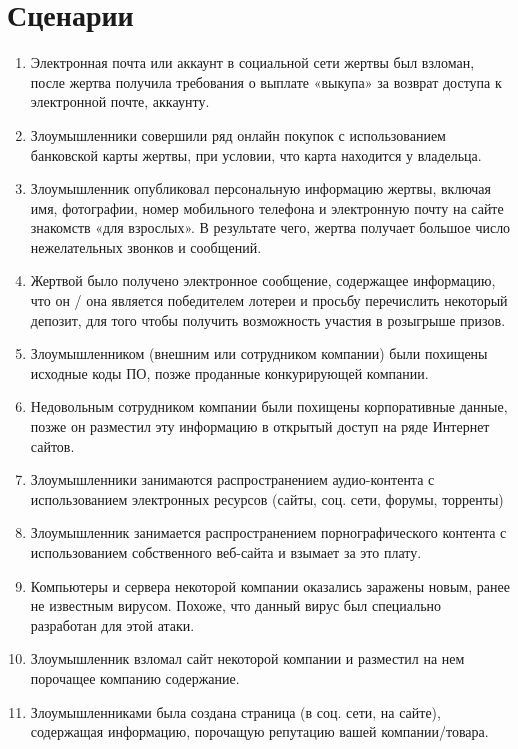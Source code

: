 \section*{Сценарии}

\begin{enumerate}
  \item Электронная почта или аккаунт в социальной сети жертвы был взломан,
    после жертва получила требования о выплате «выкупа» за возврат доступа к
    электронной почте, аккаунту.
  \item Злоумышленники совершили ряд онлайн покупок с использованием банковской
    карты жертвы, при условии, что карта находится у владельца.
  \item Злоумышленник опубликовал персональную информацию жертвы, включая имя,
    фотографии, номер мобильного телефона и электронную почту на сайте
    знакомств «для взрослых». В результате чего, жертва получает большое число
    нежелательных звонков и сообщений.
  \item Жертвой было получено электронное сообщение, содержащее информацию, что
    он / она является победителем лотереи и просьбу перечислить некоторый
    депозит, для того чтобы получить возможность участия в розыгрыше призов.
  \item Злоумышленником (внешним или сотрудником компании) были похищены
    исходные коды ПО, позже проданные конкурирующей компании.
  \item Недовольным сотрудником компании были похищены корпоративные данные,
    позже он разместил эту информацию в открытый доступ на ряде Интернет
    сайтов.
  \item Злоумышленники занимаются распространением аудио-контента с
    использованием электронных ресурсов (сайты, соц. сети, форумы, торренты)
  \item Злоумышленник занимается распространением порнографического контента с
    использованием собственного веб-сайта и взымает за это плату.
  \item Компьютеры и сервера некоторой компании оказались заражены новым, ранее
    не известным вирусом. Похоже, что данный вирус был специально разработан
    для этой атаки.
  \item Злоумышленник взломал сайт некоторой компании и разместил на нем
    порочащее компанию содержание.
  \item Злоумышленниками была создана страница (в соц. сети, на сайте),
    содержащая информацию, порочащую репутацию вашей компании/товара.
\end{enumerate}
